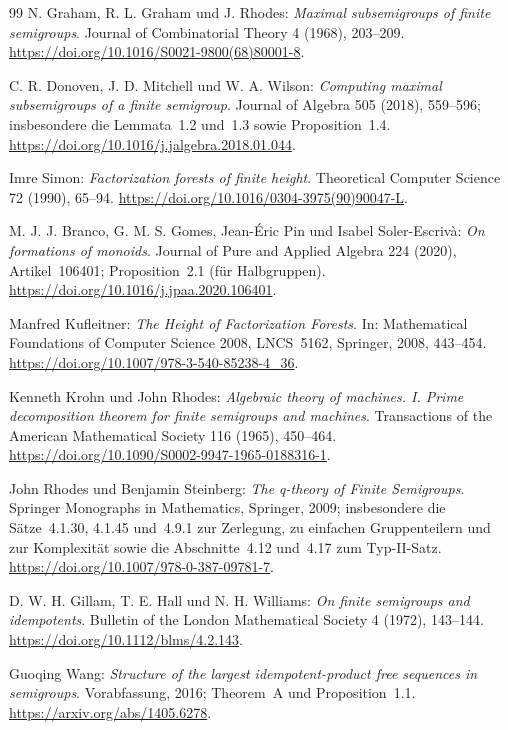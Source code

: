 \begin{thebibliography}{99}
N. Graham, R. L. Graham und J. Rhodes:
\emph{Maximal subsemigroups of finite semigroups}.
Journal of Combinatorial Theory 4 (1968), 203--209.
\url{https://doi.org/10.1016/S0021-9800(68)80001-8}.

C. R. Donoven, J. D. Mitchell und W. A. Wilson:
\emph{Computing maximal subsemigroups of a finite semigroup}.
Journal of Algebra 505 (2018), 559--596;
insbesondere die Lemmata~1.2 und~1.3 sowie Proposition~1.4.
\url{https://doi.org/10.1016/j.jalgebra.2018.01.044}.

Imre Simon: \emph{Factorization forests of finite height}.
Theoretical Computer Science 72 (1990), 65--94.
\url{https://doi.org/10.1016/0304-3975(90)90047-L}.

M. J. J. Branco, G. M. S. Gomes, Jean-Éric Pin und Isabel Soler-Escrivà:
\emph{On formations of monoids}.
Journal of Pure and Applied Algebra 224 (2020), Artikel~106401;
Proposition~2.1 (für Halbgruppen).
\url{https://doi.org/10.1016/j.jpaa.2020.106401}.

Manfred Kufleitner: \emph{The Height of Factorization Forests}.
In: Mathematical Foundations of Computer Science 2008,
LNCS~5162, Springer, 2008, 443--454.
\url{https://doi.org/10.1007/978-3-540-85238-4_36}.

Kenneth Krohn und John Rhodes:
\emph{Algebraic theory of machines. I. Prime decomposition theorem
for finite semigroups and machines}.
Transactions of the American Mathematical Society 116 (1965), 450--464.
\url{https://doi.org/10.1090/S0002-9947-1965-0188316-1}.

John Rhodes und Benjamin Steinberg:
\emph{The q-theory of Finite Semigroups}.
Springer Monographs in Mathematics, Springer, 2009;
insbesondere die Sätze~4.1.30, 4.1.45 und~4.9.1 zur Zerlegung,
zu einfachen Gruppenteilern und zur Komplexität sowie die
Abschnitte~4.12 und~4.17 zum Typ-II-Satz.
\url{https://doi.org/10.1007/978-0-387-09781-7}.

D. W. H. Gillam, T. E. Hall und N. H. Williams:
\emph{On finite semigroups and idempotents}.
Bulletin of the London Mathematical Society 4 (1972), 143--144.
\url{https://doi.org/10.1112/blms/4.2.143}.

Guoqing Wang:
\emph{Structure of the largest idempotent-product free sequences in semigroups}.
Vorabfassung, 2016; Theorem~A und Proposition~1.1.
\url{https://arxiv.org/abs/1405.6278}.


\end{thebibliography}
